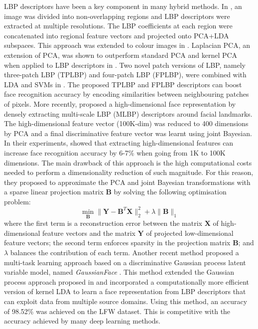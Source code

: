 \documentclass[conference]{IEEEtran}
\begin{document}
LBP descriptors have been a key component in many hybrid methods. In \cite{chan2007multi}, an image was divided into non-overlapping regions and LBP descriptors were extracted at multiple resolutions. The LBP coefficients at each region were concatenated into regional feature vectors and projected onto PCA+LDA subspaces. This approach was extended to colour images in \cite{chan2007multispectral}. Laplacian PCA, an extension of PCA, was shown to outperform standard PCA and kernel PCA when applied to LBP descriptors in \cite{zhao2007laplacian}. Two novel patch versions of LBP, namely three-patch LBP (TPLBP) and four-patch LBP (FPLBP), were combined with LDA and SVMs in \cite{wolf2008descriptor}. The proposed TPLBP and FPLBP descriptors can boost face recognition accuracy by encoding similarities between neighbouring patches of pixels. More recently, \cite{chen2013blessing} proposed a high-dimensional face representation by densely extracting multi-scale LBP (MLBP) descriptors around facial landmarks. The high-dimensional feature vector (100K-dim) was reduced to 400 dimensions by PCA and a final discriminative feature vector was learnt using joint Bayesian. In their experiments, \cite{chen2013blessing} showed that extracting high-dimensional features can increase face recognition accuracy by 6-7\% when going from 1K to 100K dimensions. The main drawback of this approach is the high computational costs needed to perform a dimensionality reduction of such magnitude. For this reason, they proposed to approximate the PCA and joint Bayesian transformations with a sparse linear projection matrix $\bm{B}$ by solving the following optimisation problem:
\begin{equation}
    \min_{\bm{B}}\|\bm{Y}-\bm{B}^T\bm{X}\|_2^2+\lambda\|\bm{B}\|_1
    \label{eq:sparse_projection}
\end{equation}
where the first term is a reconstruction error between the matrix $\bm{X}$ of high-dimensional feature vectors and the matrix $\bm{Y}$ of projected low-dimensional feature vectors; the second term enforces sparsity in the projection matrix $\bm{B}$; and $\lambda$ balances the contribution of each term. Another recent method proposed a multi-task learning approach based on a discriminative Gaussian process latent variable model, named \textit{GaussianFace} \cite{lu2015surpassing}. This method extended the Gaussian process approach proposed in \cite{urtasun2007discriminative} and incorporated a computationally more efficient version of kernel LDA to learn a face representation from LBP descriptors that can exploit data from multiple source domains. Using this method, an accuracy of 98.52\% was achieved on the LFW dataset. This is competitive with the accuracy achieved by many deep learning methods.
\end{document}
